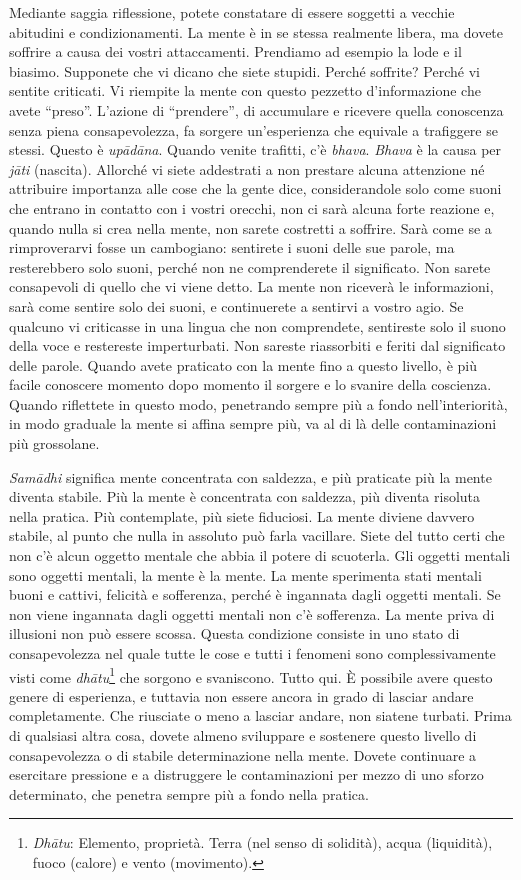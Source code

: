 Mediante saggia riflessione, potete constatare di essere soggetti a
vecchie abitudini e condizionamenti. La mente è in se stessa realmente
libera, ma dovete soffrire a causa dei vostri attaccamenti. Prendiamo ad
esempio la lode e il biasimo. Supponete che vi dicano che siete stupidi.
Perché soffrite? Perché vi sentite criticati. Vi riempite la mente con
questo pezzetto d'informazione che avete ``preso''. L'azione di
``prendere'', di accumulare e ricevere quella conoscenza senza piena
consapevolezza, fa sorgere un'esperienza che equivale a trafiggere se
stessi. Questo è \emph{upādāna}. Quando venite trafitti, c'è
\emph{bhava}. \emph{Bhava} è la causa per \emph{jāti} (nascita).
Allorché vi siete addestrati a non prestare alcuna attenzione né
attribuire importanza alle cose che la gente dice, considerandole solo
come suoni che entrano in contatto con i vostri orecchi, non ci sarà
alcuna forte reazione e, quando nulla si crea nella mente, non sarete
costretti a soffrire. Sarà come se a rimproverarvi fosse un cambogiano:
sentirete i suoni delle sue parole, ma resterebbero solo suoni, perché
non ne comprenderete il significato. Non sarete consapevoli di quello
che vi viene detto. La mente non riceverà le informazioni, sarà come
sentire solo dei suoni, e continuerete a sentirvi a vostro agio. Se
qualcuno vi criticasse in una lingua che non comprendete, sentireste
solo il suono della voce e restereste imperturbati. Non sareste
riassorbiti e feriti dal significato delle parole. Quando avete
praticato con la mente fino a questo livello, è più facile conoscere
momento dopo momento il sorgere e lo svanire della coscienza. Quando
riflettete in questo modo, penetrando sempre più a fondo
nell'interiorità, in modo graduale la mente si affina sempre più, va al
di là delle contaminazioni più grossolane.

\emph{Samādhi} significa mente concentrata con saldezza, e più praticate
più la mente diventa stabile. Più la mente è concentrata con saldezza,
più diventa risoluta nella pratica. Più contemplate, più siete
fiduciosi. La mente diviene davvero stabile, al punto che nulla in
assoluto può farla vacillare. Siete del tutto certi che non c'è alcun
oggetto mentale che abbia il potere di scuoterla. Gli oggetti mentali
sono oggetti mentali, la mente è la mente. La mente sperimenta stati
mentali buoni e cattivi, felicità e sofferenza, perché è ingannata dagli
oggetti mentali. Se non viene ingannata dagli oggetti mentali non c'è
sofferenza. La mente priva di illusioni non può essere scossa. Questa
condizione consiste in uno stato di consapevolezza nel quale tutte le
cose e tutti i fenomeni sono complessivamente visti come
\emph{dhātu}\footnote{\emph{Dhātu}: Elemento, proprietà. Terra (nel
  senso di solidità), acqua (liquidità), fuoco (calore) e vento
  (movimento).} che sorgono e svaniscono. Tutto qui. È possibile avere
questo genere di esperienza, e tuttavia non essere ancora in grado di
lasciar andare completamente. Che riusciate o meno a lasciar andare, non
siatene turbati. Prima di qualsiasi altra cosa, dovete almeno sviluppare
e sostenere questo livello di consapevolezza o di stabile determinazione
nella mente. Dovete continuare a esercitare pressione e a distruggere le
contaminazioni per mezzo di uno sforzo determinato, che penetra sempre
più a fondo nella pratica.

